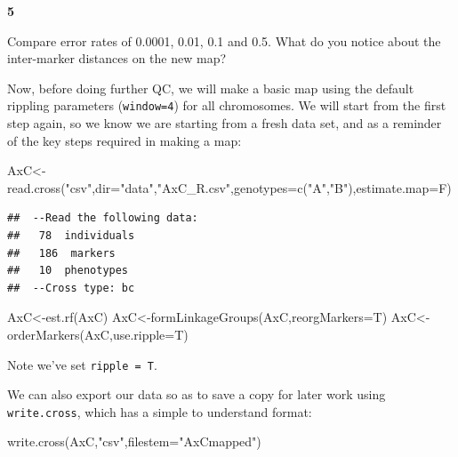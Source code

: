 \documentclass[
]{book}
\makeatletter
\newenvironment{Shaded}{\begin{snugshade}}{\end{snugshade}}
\newcommand{\AttributeTok}[1]{\textcolor[rgb]{0.77,0.63,0.00}{#1}}
\newcommand{\FunctionTok}[1]{\textcolor[rgb]{0.00,0.00,0.00}{#1}}
\newcommand{\NormalTok}[1]{#1}
\newcommand{\OtherTok}[1]{\textcolor[rgb]{0.56,0.35,0.01}{#1}}
\newcommand{\StringTok}[1]{\textcolor[rgb]{0.31,0.60,0.02}{#1}}
\newenvironment{kframe}{%
\medskip{}
\setlength{\fboxsep}{.8em}
 \def\at@end@of@kframe{}%
 \ifinner\ifhmode%
  \def\at@end@of@kframe{\end{minipage}}%
  \begin{minipage}{\columnwidth}%
 \fi\fi%
 \def\FrameCommand##1{\hskip\@totalleftmargin \hskip-\fboxsep
 \colorbox{shadecolor}{##1}\hskip-\fboxsep
     \hskip-\linewidth \hskip-\@totalleftmargin \hskip\columnwidth}%
 \MakeFramed {\advance\hsize-\width
   \@totalleftmargin\z@ \linewidth\hsize
   \@setminipage}}%
 {\par\unskip\endMakeFramed%
 \at@end@of@kframe}
\newenvironment{rmdblock}[1]
  {
  \begin{itemize}
  \renewcommand{\labelitemi}{
    \raisebox{-.7\height}[0pt][0pt]{
      {\setkeys{Gin}{width=3em,keepaspectratio}\texttt{[image: images/\#1]}}
    }
  }
  \setlength{\fboxsep}{1em}
  \begin{kframe}
  \item
  }
  {
  \end{kframe}
  \end{itemize}
  }
\newenvironment{rmdquiz}
  {\begin{rmdblock}{quiz}}
  {\end{rmdblock}}
\makeatother
\begin{document}
\begin{rmdquiz}
\textbf{5}

Compare error rates of 0.0001, 0.01, 0.1 and 0.5. What do you notice about the inter-marker distances on the new map?
\end{rmdquiz}

Now, before doing further QC, we will make a basic map using the default rippling parameters (\texttt{window=4}) for all chromosomes. We will start from the first step again, so we know we are starting from a fresh data set, and as a reminder of the key steps required in making a map:

\begin{Shaded}
\begin{Highlighting}[]
\NormalTok{AxC}\OtherTok{\textless{}{-}}\FunctionTok{read.cross}\NormalTok{(}\StringTok{"csv"}\NormalTok{,}\AttributeTok{dir=}\StringTok{"data"}\NormalTok{,}\StringTok{"AxC\_R.csv"}\NormalTok{,}\AttributeTok{genotypes=}\FunctionTok{c}\NormalTok{(}\StringTok{"A"}\NormalTok{,}\StringTok{"B"}\NormalTok{),}\AttributeTok{estimate.map=}\NormalTok{F)}
\end{Highlighting}
\end{Shaded}

\begin{verbatim}
##  --Read the following data:
##   78  individuals
##   186  markers
##   10  phenotypes
##  --Cross type: bc
\end{verbatim}

\begin{Shaded}
\begin{Highlighting}[]
\NormalTok{AxC}\OtherTok{\textless{}{-}}\FunctionTok{est.rf}\NormalTok{(AxC) }
\NormalTok{AxC}\OtherTok{\textless{}{-}}\FunctionTok{formLinkageGroups}\NormalTok{(AxC,}\AttributeTok{reorgMarkers=}\NormalTok{T) }
\NormalTok{AxC}\OtherTok{\textless{}{-}}\FunctionTok{orderMarkers}\NormalTok{(AxC,}\AttributeTok{use.ripple=}\NormalTok{T) }
\end{Highlighting}
\end{Shaded}

Note we've set \texttt{ripple\ =\ T}.

We can also export our data so as to save a copy for later work using \texttt{write.cross}, which has a simple to understand format:

\begin{Shaded}
\begin{Highlighting}[]
\FunctionTok{write.cross}\NormalTok{(AxC,}\StringTok{"csv"}\NormalTok{,}\AttributeTok{filestem=}\StringTok{"AxCmapped"}\NormalTok{) }
\end{Highlighting}
\end{Shaded}
\end{document}
